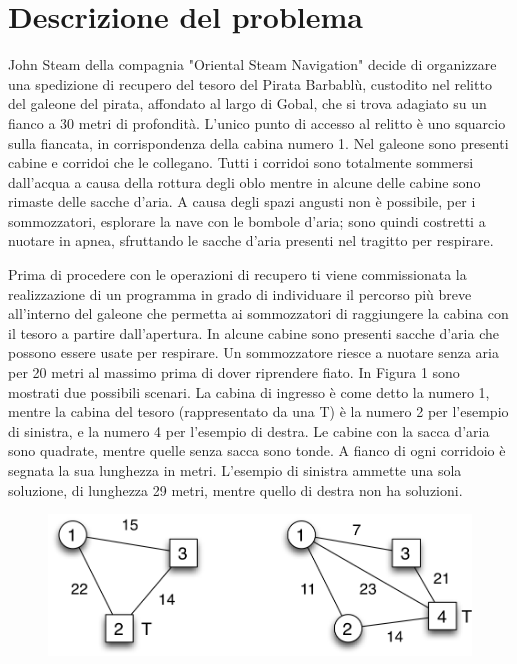 \documentclass[a4paper,11pt]{article}
\begin{document}
\vspace{0.5cm}



\vspace{0.5cm}

\section*{Descrizione del problema}
  
John Steam della compagnia "Oriental Steam Navigation" decide di
organizzare una spedizione di recupero del tesoro del Pirata Barbablù,
custodito nel relitto del galeone del pirata, affondato al largo di
Gobal, che si trova adagiato su un fianco a 30 metri di profondità.
L'unico punto di accesso al relitto è uno squarcio sulla fiancata, in
corrispondenza della cabina numero 1. Nel galeone sono presenti cabine e
corridoi che le collegano. Tutti i corridoi sono totalmente sommersi
dall'acqua a causa della rottura degli oblo mentre in alcune delle
cabine sono rimaste delle sacche d'aria. A causa degli spazi angusti non
è possibile, per i sommozzatori, esplorare la nave con le bombole
d'aria; sono quindi costretti a nuotare in apnea, sfruttando le sacche
d'aria presenti nel tragitto per respirare. 
        
Prima di procedere con le operazioni di recupero ti viene commissionata
la realizzazione di un programma in grado di individuare il percorso più
breve all'interno del galeone che permetta ai sommozzatori di
raggiungere la cabina con il tesoro a partire dall'apertura.  In alcune
cabine sono presenti sacche d'aria che possono essere usate per
respirare. Un sommozzatore riesce a nuotare senza aria per 20 metri al
massimo prima di dover riprendere fiato.  In Figura 1 sono mostrati due
possibili scenari. La cabina di ingresso è come detto la numero 1,
mentre la cabina del tesoro (rappresentato da una T) è la numero 2 per
l'esempio di sinistra, e la numero 4 per l'esempio di destra. Le cabine
con la sacca d'aria sono quadrate, mentre quelle senza sacca sono tonde.
A fianco di ogni corridoio è segnata la sua lunghezza in metri.
L'esempio di sinistra ammette una sola soluzione, di lunghezza 29 metri,
mentre quello di destra non ha soluzioni.
        
\begin{figure}[h!] \centering \caption{} \includegraphics{mappa.png}
\end{figure}
\end{document}
